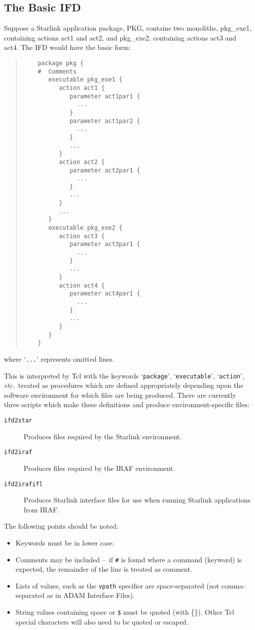 \documentclass[twoside,11pt]{article}
\newcommand{\htmladdnormallink}[2]{#1}
\newcommand{\htmlref}[2]{#1}
\newcommand{\xlabel}[1]{}
\newcommand{\TCLURL}{http://sunscript.sun.com/tcltext.html}
\newcommand{\dash}{--}
\newcommand{\dash}{-}
\begin{document}
\subsection{\xlabel{the_basic_ifd}The Basic IFD}
Suppose a Starlink application package, PKG, contains two monoliths,
pkg\_exe1, containing actions act1 and act2, and pkg\_exe2, containing actions
act3 and act4. The IFD would have the basic form:
\begin{quote} \begin{verbatim}
    package pkg {
    #  Comments
       executable pkg_exe1 {
          action act1 {
             parameter act1par1 {
               ...
             }
             parameter act1par2 {
               ...
             }
             ...
          }
          action act2 {
             parameter act2par1 {
               ...
             }
             ...
          }
          ...
       }
       executable pkg_exe2 {
          action act3 {
             parameter act3par1 {
               ...
             }
             ...
          }
          action act4 {
             parameter act4par1 {
               ...
             }
             ...
          }
       }
    }
\end{verbatim} \end{quote}
where `\texttt{...}' represents omitted lines.

This is interpreted by
\htmladdnormallink{Tcl}{\TCLURL}
with the keywords `\texttt{package}', `\texttt{executable}', `\texttt{action}',
\textit{etc.}\ treated as procedures which are defined appropriately depending
upon the software environment for which files are being produced.
There are currently three scripts which make these definitions and produce
environment-specific files:
\begin{description}
\item[\htmlref{\texttt{ifd2star}}{ifd2star}] Produces files required by the
Starlink environment.
\item[\htmlref{\texttt{ifd2iraf}}{ifd2iraf}] Produces files required by the
IRAF environment.
\item[\htmlref{\texttt{ifd2irafifl}}{ifd2irafifl}] Produces Starlink interface
files for use when running Starlink applications from IRAF.
\end{description}

The following points should be noted:
\begin{itemize}
\item Keywords must be in lower case.
\item Comments may be included \dash\ if \texttt{\#} is found where a command
(keyword) is expected, the remainder of the line is treated as comment.
\item Lists of values, such as the
\htmlref{\texttt{vpath}}{vpath} specifier are space-separated (not
comma-separated as in ADAM Interface Files).
\item String values containing space or \texttt{\$} must be quoted (with
\{\}).
Other Tcl special characters will also need to be quoted or escaped.
\end{itemize}
\end{document}
